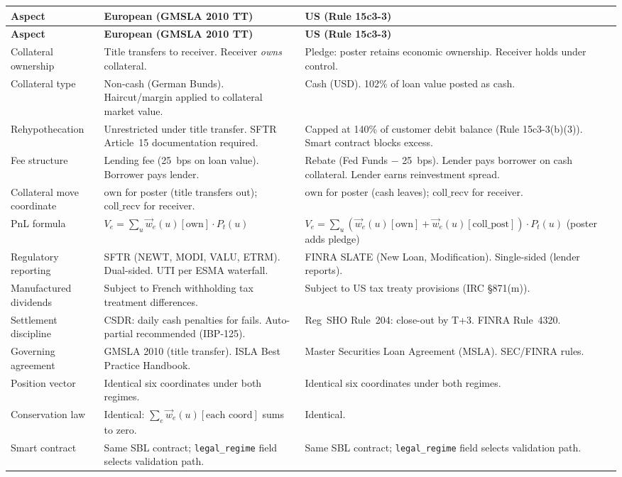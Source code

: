 \documentclass[11pt,a4paper]{article}
\begin{document}
\begin{center}\small
\begin{longtable}{p{3.2cm} p{5.2cm} p{5.2cm}}
\toprule
\textbf{Aspect} & \textbf{European (GMSLA 2010 TT)} & \textbf{US (Rule 15c3-3)} \\
\midrule
\endfirsthead
\toprule
\textbf{Aspect} & \textbf{European (GMSLA 2010 TT)} & \textbf{US (Rule 15c3-3)} \\
\midrule
\endhead
\bottomrule
\endfoot
Collateral ownership & Title transfers to receiver. Receiver \emph{owns} collateral. & Pledge: poster retains economic ownership. Receiver holds under control. \\
\midrule
Collateral type & Non-cash (German Bunds). Haircut/margin applied to collateral market value. & Cash (USD). 102\% of loan value posted as cash. \\
\midrule
Rehypothecation & Unrestricted under title transfer. SFTR Article~15 documentation required. & Capped at 140\% of customer debit balance (Rule 15c3-3(b)(3)). Smart contract blocks excess. \\
\midrule
Fee structure & Lending fee (25~bps on loan value). Borrower pays lender. & Rebate (Fed Funds $-$ 25~bps). Lender pays borrower on cash collateral. Lender earns reinvestment spread. \\
\midrule
Collateral move coordinate & $\mathrm{own}$ for poster (title transfers out); $\mathrm{coll\_recv}$ for receiver. & $\mathrm{own}$ for poster (cash leaves); $\mathrm{coll\_recv}$ for receiver. \\
\midrule
PnL formula & $V_e = \sum_u \vec{w}_e(u)[\mathrm{own}] \cdot P_t(u)$ & $V_e = \sum_u (\vec{w}_e(u)[\mathrm{own}] + \vec{w}_e(u)[\mathrm{coll\_post}]) \cdot P_t(u)$ (poster adds pledge) \\
\midrule
Regulatory reporting & SFTR (NEWT, MODI, VALU, ETRM). Dual-sided. UTI per ESMA waterfall. & FINRA SLATE (New Loan, Modification). Single-sided (lender reports). \\
\midrule
Manufactured dividends & Subject to French withholding tax treatment differences. & Subject to US tax treaty provisions (IRC \S871(m)). \\
\midrule
Settlement discipline & CSDR: daily cash penalties for fails. Auto-partial recommended (IBP-125). & Reg~SHO Rule~204: close-out by T+3. FINRA Rule~4320. \\
\midrule
Governing agreement & GMSLA 2010 (title transfer). ISLA Best Practice Handbook. & Master Securities Loan Agreement (MSLA). SEC/FINRA rules. \\
\midrule
Position vector & Identical six coordinates under both regimes. & Identical six coordinates under both regimes. \\
\midrule
Conservation law & Identical: $\sum_e \vec{w}_e(u)[\text{each coord}]$ sums to zero. & Identical. \\
\midrule
Smart contract & Same SBL contract; \texttt{legal\_regime} field selects validation path. & Same SBL contract; \texttt{legal\_regime} field selects validation path. \\
\bottomrule
\end{longtable}
\end{center}
\end{document}
